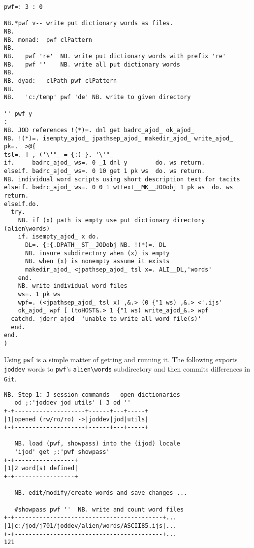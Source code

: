 \begin{enumerate}
\begin{lstlisting}[frame=single,framerule=0pt,basicstyle=\ttfamily\footnotesize]
pwf=: 3 : 0

NB.*pwf v-- write put dictionary words as files.
NB.
NB. monad:  pwf clPattern
NB.
NB.   pwf 're'  NB. write put dictionary words with prefix 're'
NB.   pwf ''    NB. write all put dictionary words
NB.
NB. dyad:   clPath pwf clPattern
NB.
NB.   'c:/temp' pwf 'de' NB. write to given directory

'' pwf y
:
NB. JOD references !(*)=. dnl get badrc_ajod_ ok_ajod_ 
NB. !(*)=. isempty_ajod_ jpathsep_ajod_ makedir_ajod_ write_ajod_
pk=.  >@{                        
tsl=. ] , ('\'"_ = {:) }. '\'"_  
if.     badrc_ajod_ ws=. 0 _1 dnl y        do. ws return.
elseif. badrc_ajod_ ws=. 0 10 get 1 pk ws  do. ws return.
NB. individual word scripts using short description text for tacits
elseif. badrc_ajod_ ws=. 0 0 1 wttext__MK__JODobj 1 pk ws  do. ws return.
elseif.do.
  try.
    NB. if (x) path is empty use put dictionary directory (alien\words)
    if. isempty_ajod_ x do.
      DL=. {:{.DPATH__ST__JODobj NB. !(*)=. DL
      NB. insure subdirectory when (x) is empty 
      NB. when (x) is nonempty assume it exists
      makedir_ajod_ <jpathsep_ajod_ tsl x=. ALI__DL,'words'
    end.
    NB. write individual word files
    ws=. 1 pk ws
    wpf=. (<jpathsep_ajod_ tsl x) ,&.> (0 {"1 ws) ,&.> <'.ijs'
    ok_ajod_ wpf [ (toHOST&.> 1 {"1 ws) write_ajod_&.> wpf
  catchd. jderr_ajod_ 'unable to write all word file(s)'
  end.
end.
)
\end{lstlisting}

Using \texttt{pwf} is a simple matter of getting and running it.  The following
exports  \texttt{joddev} words  to  \texttt{pwf}'s \verb|alien\words| subdirectory
and then commits differences in \texttt{Git}.

\begin{lstlisting}[frame=single,framerule=0pt,basicstyle=\ttfamily\footnotesize]
   NB. Step 1: J session commands - open dictionaries
   od ;:'joddev jod utils' [ 3 od ''
+-+--------------------+------+---+-----+
|1|opened (rw/ro/ro) ->|joddev|jod|utils|
+-+--------------------+------+---+-----+

   NB. load (pwf, showpass) into the (ijod) locale
   'ijod' get ;:'pwf showpass'
+-+-----------------+
|1|2 word(s) defined|
+-+-----------------+

   NB. edit/modify/create words and save changes ...

   #showpass pwf ''  NB. write and count word files
+-+------------------------------------------+...
|1|c:/jod/j701/joddev/alien/words/ASCII85.ijs|...
+-+------------------------------------------+...
121
\end{lstlisting}


\end{enumerate}
